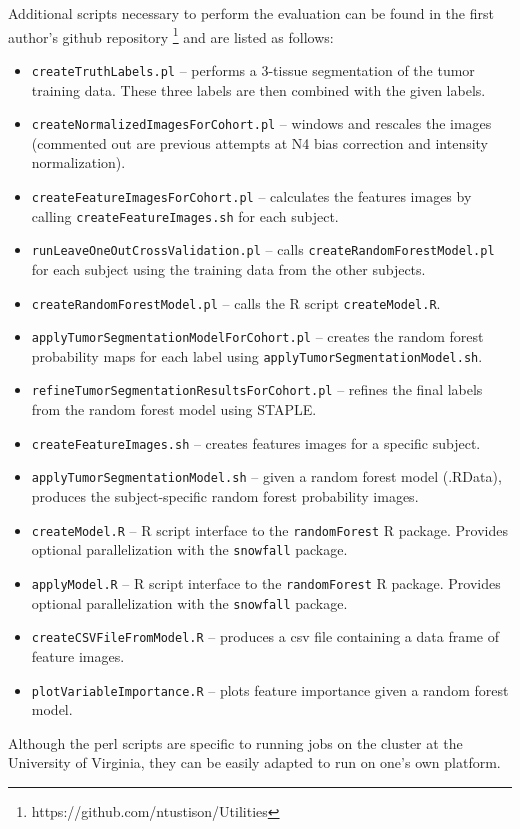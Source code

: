 \documentclass{llncs}
\begin{document}
Additional scripts necessary to perform the evaluation can be found in the 
first author's github repository%
\footnote{
https://github.com/ntustison/Utilities
}
and are listed as follows: 
\begin{itemize}
  \item \verb#createTruthLabels.pl# -- performs a 3-tissue segmentation of the tumor training data.  These three labels are then combined with the given labels. 
  \item \verb#createNormalizedImagesForCohort.pl# -- windows and rescales the images (commented out are previous attempts at N4 bias correction and intensity normalization).
  \item \verb#createFeatureImagesForCohort.pl# -- calculates the features images by calling \verb#createFeatureImages.sh# for each subject.
  \item \verb#runLeaveOneOutCrossValidation.pl#  -- calls \verb#createRandomForestModel.pl# for each subject using the training 
  data from the other subjects.
  \item \verb#createRandomForestModel.pl# -- calls the R script \verb#createModel.R#.
  \item \verb#applyTumorSegmentationModelForCohort.pl# -- creates the random
  forest probability maps for each label using \verb#applyTumorSegmentationModel.sh#.
  \item \verb#refineTumorSegmentationResultsForCohort.pl# -- refines the final labels from the random forest model using STAPLE.
  \item \verb#createFeatureImages.sh#  -- creates features images for a specific
  subject.
  \item \verb#applyTumorSegmentationModel.sh# -- given a random forest model (.RData), produces the subject-specific random forest probability images.
  \item \verb#createModel.R# -- R script interface to the \verb#randomForest# R package.  Provides optional parallelization with the \verb#snowfall# package.
  \item \verb#applyModel.R# -- R script interface to the \verb#randomForest# R package.  Provides optional parallelization with the \verb#snowfall# package.
  \item \verb#createCSVFileFromModel.R# -- produces a csv file containing a data frame of feature images.
  \item \verb#plotVariableImportance.R# -- plots feature importance given a random forest model.
\end{itemize}
Although the perl scripts are specific to running jobs on the cluster at the 
University of Virginia, they can be easily adapted to run on one's own platform.
\end{document}
